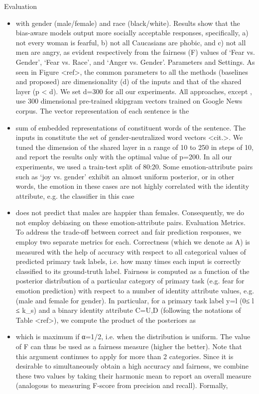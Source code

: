 \documentclass{beamer}
\begin{document}
\begin{frame}{Evaluation}
\begin{itemize}
\item
with gender (male/female) and race (black/white). Results show that the bias-aware models output more socially acceptable responses, specifically, a) not every woman is fearful, b) not all Caucasians are phobic, and c) not all men are angry, as evident respectively from the fairness (F) values of `Fear vs. Gender', `Fear vs. Race', and `Anger vs. Gender'. Parameters and Settings. As seen in Figure <ref>, the common parameters to all the methods (baselines and proposed) are dimensionality (d) of the inputs and that of the shared layer (p < d). We set d=300 for all our experiments. All approaches, except , use 300 dimensional pre-trained skipgram vectors trained on Google News corpus. The vector representation of each sentence is the
\item
sum of embedded representations of constituent words of the sentence. The inputs in constitute the set of gender-neutralized word vectors <cit.>. We tuned the dimension of the shared layer in a range of 10 to 250 in steps of 10, and report the results only with the optimal value of p=200. In all our experiments, we used a train-test split of 80:20. Some emotion-attribute pairs such as `joy vs. gender' exhibit an almost uniform posterior, or in other words, the emotion in these cases are not highly correlated with the identity attribute, e.g. the classifier in this case
\item
does not predict that males are happier than females. Consequently, we do not employ debiasing on these emotion-attribute pairs. Evaluation Metrics. To address the trade-off between correct and fair prediction responses, we employ two separate metrics for each. Correctness (which we denote as A) is measured with the help of accuracy with respect to all categorical values of predicted primary task labels, i.e. how many times each input is correctly classified to its ground-truth label. Fairness is computed as a function of the posterior distribution of a particular category of primary task (e.g. fear for emotion prediction) with respect to a number of identity attribute values, e.g. (male and female for gender). In particular, for a primary task label y=l (0≤ l ≤ k_s) and a binary identity attribute C={U,D} (following the notations of Table <ref>), we compute the product of the posteriors as
\item
which is maximum if α=1/2, i.e. when the distribution is uniform. The value of F can thus be used as a fairness measure (higher the better). Note that this argument continues to apply for more than 2 categories. Since it is desirable to simultaneously obtain a high accuracy and fairness, we combine these two values by taking their harmonic mean to report an overall measure (analogous to measuring F-score from precision and recall). Formally,

\end{itemize}
\end{frame}
\end{document}
